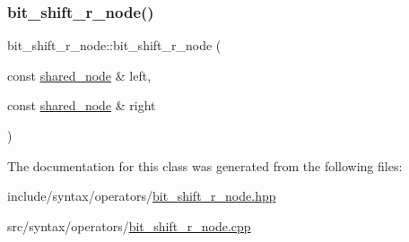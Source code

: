 \subsubsection{\texorpdfstring{bit\+\_\+shift\+\_\+r\+\_\+node()}{bit\_shift\_r\_node()}}
{\footnotesize\ttfamily bit\+\_\+shift\+\_\+r\+\_\+node\+::bit\+\_\+shift\+\_\+r\+\_\+node (\begin{DoxyParamCaption}\item[{const \hyperlink{namespacejawe_a3f307481d921b6cbb50cc8511fc2b544}{shared\+\_\+node} \&}]{left,  }\item[{const \hyperlink{namespacejawe_a3f307481d921b6cbb50cc8511fc2b544}{shared\+\_\+node} \&}]{right }\end{DoxyParamCaption})}



The documentation for this class was generated from the following files\+:\begin{DoxyCompactItemize}
\item 
include/syntax/operators/\hyperlink{bit__shift__r__node_8hpp}{bit\+\_\+shift\+\_\+r\+\_\+node.\+hpp}\item 
src/syntax/operators/\hyperlink{bit__shift__r__node_8cpp}{bit\+\_\+shift\+\_\+r\+\_\+node.\+cpp}\end{DoxyCompactItemize}
